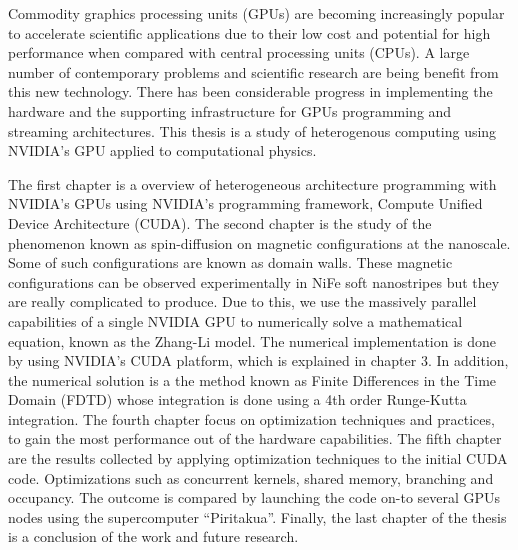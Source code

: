 \documentclass[11pt, oneside, a4paper]{Thesis} %
\begin{document}
\pagestyle{fancy} %

\tableofcontents %

\listoffigures %





\introductions

\bigskip

Commodity graphics processing units (GPUs) are becoming increasingly popular to accelerate scientific applications due to their low cost and potential for high performance when compared with central processing units (CPUs). A large number of contemporary problems and scientific research are being benefit from this new technology. There has been considerable progress in implementing the hardware and the supporting infrastructure for GPUs programming and streaming architectures. This thesis is a study  of heterogenous computing using NVIDIA's GPU applied to  computational physics.

The first chapter is a overview of heterogeneous architecture programming with NVIDIA's GPUs using NVIDIA's programming framework, Compute Unified Device Architecture (CUDA). The second chapter is the study of the phenomenon known as spin-diffusion on magnetic configurations at the nanoscale. Some of such configurations are known as domain walls. These magnetic configurations can be observed experimentally in NiFe soft nanostripes but they are really complicated to produce. Due to this, we use the massively parallel capabilities of a single NVIDIA GPU to numerically solve a mathematical equation, known as the Zhang-Li model. The numerical implementation is done by using NVIDIA's CUDA platform, which is explained in chapter 3. In addition, the numerical solution is a the method known as Finite Differences in the Time Domain (FDTD) whose integration is done using a 4th order Runge-Kutta integration. The fourth  chapter focus on optimization techniques and practices, to gain the most performance out of the hardware capabilities. The fifth chapter are the results collected by applying optimization techniques to the initial CUDA code. Optimizations such as concurrent kernels, shared memory, branching and occupancy. The outcome is compared by launching the code on-to several GPUs nodes using the supercomputer ``Piritakua''. Finally, the last chapter of the thesis is a conclusion of the work and future research.
\end{document}

